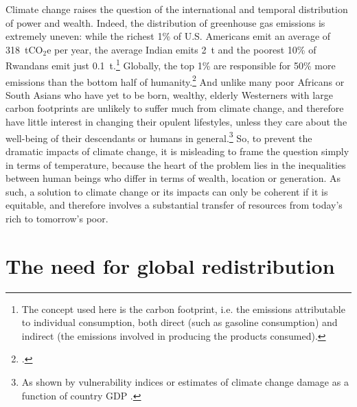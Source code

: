 \documentclass[a5paper,english,openany]{memoir}
\begin{document}
Climate change raises the question of the international and temporal distribution of power and wealth. %
Indeed, the distribution of greenhouse gas emissions is extremely uneven: while the richest 1\% of U.S. Americans emit an average of 318~tCO$_\text{2}$e per year, the average Indian emits 2~t and the poorest 10\% of Rwandans emit just 0.1~t.\footnote{The concept used here is the carbon footprint, i.e. the emissions attributable to individual consumption, both direct (such as gasoline consumption) and indirect (the emissions involved in producing the products consumed).} %
Globally, the top 1\% are responsible for 50\% more emissions than the bottom half of humanity.\footnote{\citet{bruckner_impacts_2022,chancel_carbon_2015}.} 
And unlike many poor Africans or South Asians who have yet to be born, wealthy, elderly Westerners with large carbon footprints are unlikely to suffer much from climate change, and therefore have little interest in changing their opulent lifestyles, unless they care about the well-being of their descendants or humans in general.\footnote{As shown by vulnerability indices \citep{chen_university_2015} or estimates of climate change damage as a function of country GDP \citep{burke_global_2015}.} 
So, to prevent the dramatic impacts of climate change, it is misleading to frame the question simply in terms of temperature, %
because the heart of the problem lies in the inequalities between human beings who differ in terms of wealth, location or generation. As such, a solution to climate change or its impacts can only be coherent if it is equitable, and therefore involves a substantial transfer of resources from today's rich to tomorrow's poor. %


\chapter{The need for global redistribution\label{ch:redistribution_necessaire}}
\end{document}
